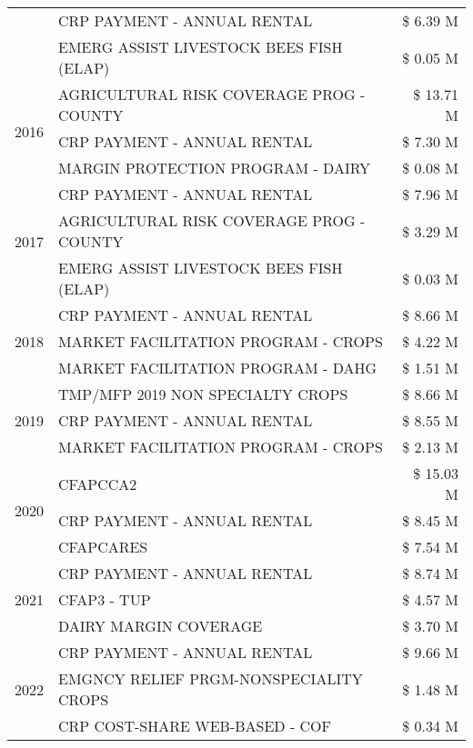 \begin{tabular}{llr}
 & CRP PAYMENT - ANNUAL RENTAL & \$ 6.39 M \\
 & EMERG ASSIST LIVESTOCK BEES FISH (ELAP) & \$ 0.05 M \\
\cline{1-3}
\multirow[t]{3}{*}{2016} & AGRICULTURAL RISK COVERAGE PROG - COUNTY & \$ 13.71 M \\
 & CRP PAYMENT - ANNUAL RENTAL & \$ 7.30 M \\
 & MARGIN PROTECTION PROGRAM - DAIRY & \$ 0.08 M \\
\cline{1-3}
\multirow[t]{3}{*}{2017} & CRP PAYMENT - ANNUAL RENTAL & \$ 7.96 M \\
 & AGRICULTURAL RISK COVERAGE PROG - COUNTY & \$ 3.29 M \\
 & EMERG ASSIST LIVESTOCK BEES FISH (ELAP) & \$ 0.03 M \\
\cline{1-3}
\multirow[t]{3}{*}{2018} & CRP PAYMENT - ANNUAL RENTAL & \$ 8.66 M \\
 & MARKET FACILITATION PROGRAM - CROPS & \$ 4.22 M \\
 & MARKET FACILITATION PROGRAM - DAHG & \$ 1.51 M \\
\cline{1-3}
\multirow[t]{3}{*}{2019} & TMP/MFP 2019 NON SPECIALTY CROPS & \$ 8.66 M \\
 & CRP PAYMENT - ANNUAL RENTAL & \$ 8.55 M \\
 & MARKET FACILITATION PROGRAM - CROPS & \$ 2.13 M \\
\cline{1-3}
\multirow[t]{3}{*}{2020} & CFAPCCA2 & \$ 15.03 M \\
 & CRP PAYMENT - ANNUAL RENTAL & \$ 8.45 M \\
 & CFAPCARES & \$ 7.54 M \\
\cline{1-3}
\multirow[t]{3}{*}{2021} & CRP PAYMENT - ANNUAL RENTAL & \$ 8.74 M \\
 & CFAP3 - TUP & \$ 4.57 M \\
 & DAIRY MARGIN COVERAGE & \$ 3.70 M \\
\cline{1-3}
\multirow[t]{3}{*}{2022} & CRP PAYMENT - ANNUAL RENTAL & \$ 9.66 M \\
 & EMGNCY RELIEF PRGM-NONSPECIALITY CROPS & \$ 1.48 M \\
 & CRP COST-SHARE WEB-BASED - COF & \$ 0.34 M \\
\cline{1-3}
\bottomrule
\end{tabular}
